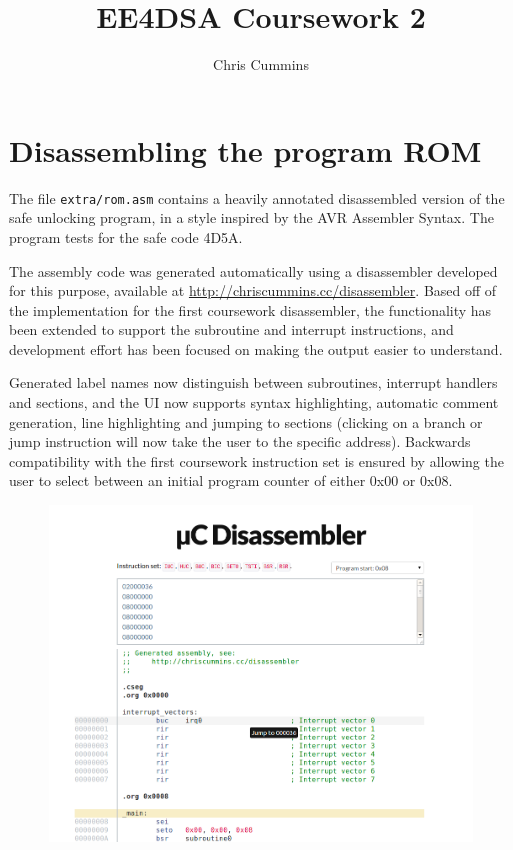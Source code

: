 \documentclass[12pt,a4paper]{article}
\title{EE4DSA Coursework 2}
\author{Chris Cummins}
\begin{document}
\maketitle

\section{Disassembling the program ROM}

The file \texttt{extra/rom.asm} contains a heavily annotated
disassembled version of the safe unlocking program, in a style
inspired by the AVR Assembler Syntax. The program tests for the safe
code 4D5A.

The assembly code was generated automatically using a disassembler
developed for this purpose, available at
\url{http://chriscummins.cc/disassembler}. Based off of the
implementation for the first coursework disassembler, the
functionality has been extended to support the subroutine and
interrupt instructions, and development effort has been focused on
making the output easier to understand.

Generated label names now distinguish between subroutines, interrupt
handlers and sections, and the UI now supports syntax highlighting,
automatic comment generation, line highlighting and jumping to
sections (clicking on a branch or jump instruction will now take the
user to the specific address). Backwards compatibility with the first
coursework instruction set is ensured by allowing the user to select
between an initial program counter of either 0x00 or 0x08.

\begin{figure}[H]
  \centering
  \includegraphics[width=6.2in]{assets/disassembler.png}
\end{figure}
\end{document}
